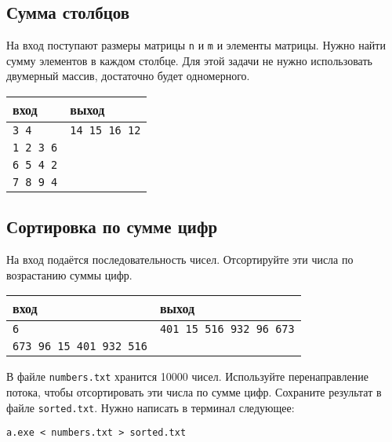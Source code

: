 \documentclass{article}
\begin{document}
\subsection{Сумма столбцов}
На вход поступают размеры матрицы \texttt{n} и \texttt{m} и элементы матрицы. Нужно найти сумму элементов в каждом столбце. Для этой задачи не нужно использовать двумерный массив, достаточно будет одномерного.
\begin{center}
\begin{tabular}{ l | l }
 вход & выход \\ \hline
 \texttt{3 4} &    \texttt{14 15 16 12}  \\ 
 \texttt{1 2 3 6} &  \\
 \texttt{6 5 4 2} &  \\ 
 \texttt{7 8 9 4} &  \\ 
\end{tabular}
\end{center}


\subsection{Сортировка по сумме цифр}
На вход подаётся последовательность чисел. Отсортируйте эти числа по возрастанию суммы цифр.
\begin{center}
\begin{tabular}{ l | l }
 вход & выход \\ \hline
 \texttt{6} & \texttt{401 15 516 932 96 673}  \\  
 \texttt{673 96 15 401 932 516} &  \\
\end{tabular}
\end{center}
В файле \texttt{numbers.txt} хранится 10000 чисел. Используйте перенаправление потока, чтобы отсортировать эти числа по сумме цифр. Сохраните результат в файле \texttt{sorted.txt}. Нужно написать в терминал следующее:

\begin{verbatim}
a.exe < numbers.txt > sorted.txt
\end{verbatim}
\end{document}
